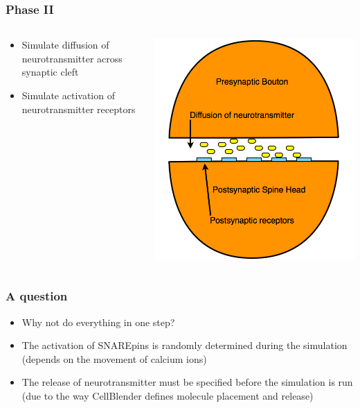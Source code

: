 \documentclass{beamer}
\begin{document}
\frame
{
    \frametitle{Phase II}
    \begin{columns}
    \begin{column}{0.5\textwidth}
    \begin{itemize}
        \item Simulate diffusion of neurotransmitter across synaptic cleft 
        \item Simulate activation of neurotransmitter receptors 
    \end{itemize}
    \end{column}
\begin{column}{0.5\textwidth}
    \includegraphics[width=1\textwidth]{postsynaptic.png}
    \end{column}
    \end{columns}
}

\frame
{ \frametitle{A question}
    \begin{itemize}
        \item Why not do everything in one step?
        \item The activation of SNAREpins is randomly determined during the simulation (depends on the movement of calcium ions)
        \item The release of neurotransmitter must be specified before the simulation is run (due to the way CellBlender defines molecule placement and release)
    \end{itemize}
}
\end{document}
